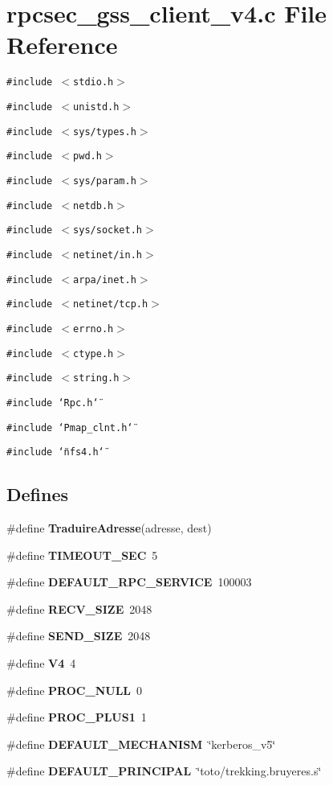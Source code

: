 \section{rpcsec\_\-gss\_\-client\_\-v4.c File Reference}
\label{rpcsec__gss__client__v4_8c}
{\tt \#include $<$stdio.h$>$}\par
{\tt \#include $<$unistd.h$>$}\par
{\tt \#include $<$sys/types.h$>$}\par
{\tt \#include $<$pwd.h$>$}\par
{\tt \#include $<$sys/param.h$>$}\par
{\tt \#include $<$netdb.h$>$}\par
{\tt \#include $<$sys/socket.h$>$}\par
{\tt \#include $<$netinet/in.h$>$}\par
{\tt \#include $<$arpa/inet.h$>$}\par
{\tt \#include $<$netinet/tcp.h$>$}\par
{\tt \#include $<$errno.h$>$}\par
{\tt \#include $<$ctype.h$>$}\par
{\tt \#include $<$string.h$>$}\par
{\tt \#include \char`\"{}Rpc.h\char`\"{}}\par
{\tt \#include \char`\"{}Pmap\_\-clnt.h\char`\"{}}\par
{\tt \#include \char`\"{}nfs4.h\char`\"{}}\par
\subsection*{Defines}
\begin{CompactItemize}
\item 
\#define {\bf Traduire\-Adresse}(adresse, dest)
\item 
\#define {\bf TIMEOUT\_\-SEC}\ 5
\item 
\#define {\bf DEFAULT\_\-RPC\_\-SERVICE}\ 100003
\item 
\#define {\bf RECV\_\-SIZE}\ 2048
\item 
\#define {\bf SEND\_\-SIZE}\ 2048
\item 
\#define {\bf V4}\ 4
\item 
\#define {\bf PROC\_\-NULL}\ 0
\item 
\#define {\bf PROC\_\-PLUS1}\ 1
\item 
\#define {\bf DEFAULT\_\-MECHANISM}\ \char`\"{}kerberos\_\-v5\char`\"{}
\item 
\#define {\bf DEFAULT\_\-PRINCIPAL}\ \char`\"{}toto/trekking.bruyeres.s\char`\"{}
\end{CompactItemize}
